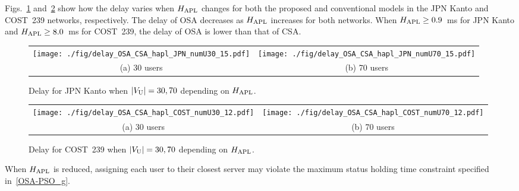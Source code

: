 \documentclass[10pt, letterpaper]{IEEEtran}
\newcommand\blue[1]{\textcolor{blue}{#1}}
\begin{document}
\begin{CJK}{UTF8}{ipxm}
Figs.~\ref{fig:delay_OSA_CSA_hapl_JPN} and~\ref{fig:delay_OSA_CSA_hapl_COST} show how the delay varies when $H_{\rm APL}$ changes for both the proposed and conventional models in the JPN Kanto and COST~239 networks, respectively.
The delay of OSA decreases as $H_{\rm APL}$ increases for both networks.
When $H_{\rm APL} \geq 0.9$~ms for JPN Kanto and $H_{\rm APL} \geq 8.0$~ms for COST~239, the delay of OSA is lower than that of CSA.
\begin{figure}[t]
  \begin{center}
      \begin{tabular}{cc}
      \texttt{[image: ./fig/delay\_OSA\_CSA\_hapl\_JPN\_numU30\_15.pdf]} &
      \texttt{[image: ./fig/delay\_OSA\_CSA\_hapl\_JPN\_numU70\_15.pdf]} \\
      (a) 30 users & (b) 70 users
      \end{tabular}
  \end{center}
  \caption{Delay for JPN Kanto when $|V_{\rm U}| = 30, 70$ depending on $H_{\rm APL}$.}
  \label{fig:delay_OSA_CSA_hapl_JPN}
\end{figure}
\begin{figure}[t]
  \begin{center}
      \begin{tabular}{cc}
      \texttt{[image: ./fig/delay\_OSA\_CSA\_hapl\_COST\_numU30\_12.pdf]} &
      \texttt{[image: ./fig/delay\_OSA\_CSA\_hapl\_COST\_numU70\_12.pdf]} \\
      (a) 30 users & (b) 70 users
      \end{tabular}
  \end{center}
  \caption{Delay for COST~239 when $|V_{\rm U}| = 30, 70$ depending on $H_{\rm APL}$.}
  \label{fig:delay_OSA_CSA_hapl_COST}
\end{figure}
When $H_{\rm APL}$ is reduced, assigning each user to their closest server may violate the maximum status holding time constraint specified in~\eqref{OSA-PSO_g}.

\end{CJK}
\end{document}
